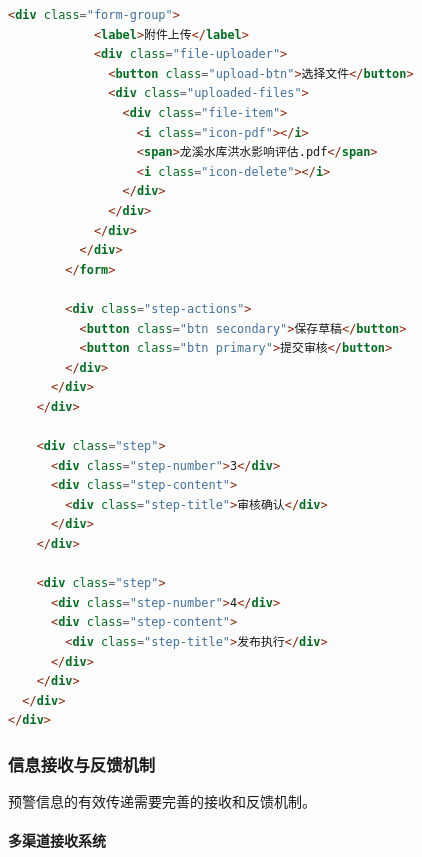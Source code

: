 \begin{lstlisting}[language=HTML]
          <div class="form-group">
            <label>附件上传</label>
            <div class="file-uploader">
              <button class="upload-btn">选择文件</button>
              <div class="uploaded-files">
                <div class="file-item">
                  <i class="icon-pdf"></i>
                  <span>龙溪水库洪水影响评估.pdf</span>
                  <i class="icon-delete"></i>
                </div>
              </div>
            </div>
          </div>
        </form>
        
        <div class="step-actions">
          <button class="btn secondary">保存草稿</button>
          <button class="btn primary">提交审核</button>
        </div>
      </div>
    </div>
    
    <div class="step">
      <div class="step-number">3</div>
      <div class="step-content">
        <div class="step-title">审核确认</div>
      </div>
    </div>
    
    <div class="step">
      <div class="step-number">4</div>
      <div class="step-content">
        <div class="step-title">发布执行</div>
      </div>
    </div>
  </div>
</div>
\end{lstlisting}

\subsubsection{信息接收与反馈机制}\label{ux4fe1ux606fux63a5ux6536ux4e0eux53cdux9988ux673aux5236}

预警信息的有效传递需要完善的接收和反馈机制。

\paragraph{多渠道接收系统}\label{ux591aux6e20ux9053ux63a5ux6536ux7cfbux7edf}

